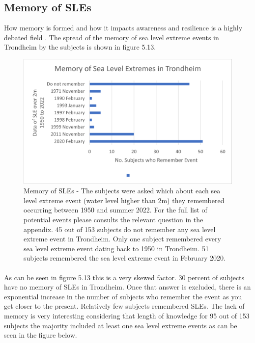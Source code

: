 \subsection{Memory of SLEs}
How memory is formed and how it impacts awareness and resilience is a highly debated field \cite{de_guttry_expiry_2022}. The spread of the memory of sea level extreme events in Trondheim by the subjects is shown in figure 5.13.

\begin{figure}[H]
    \centering
    \includegraphics{fig_results/memory-sle.png}
    \caption{Memory of SLEs - The subjects were asked which about each sea level extreme event (water level higher than 2m) they remembered occurring between 1950 and summer 2022. For the full list of potential events please consults the relevant question in the appendix. 45 out of 153 subjects do not remember any sea level extreme event in Trondheim. Only one subject remembered every sea level extreme event dating back to 1950 in Trondheim. 51 subjects remembered the sea level extreme event in February 2020. }
    \label{fig:my_label}
\end{figure}
\paragraph{}

As can be seen in figure 5.13  this is a very skewed factor. 30 percent of subjects have no memory of SLEs in Trondheim. Once that answer is excluded, there is an exponential increase in the number of subjects who remember the event as you get closer to the present. Relatively few subjects remembered SLEs. The lack of memory is very interesting considering that length of knowledge for 95 out of 153 subjects the majority included at least one sea level extreme events as can be seen in the figure below. 

